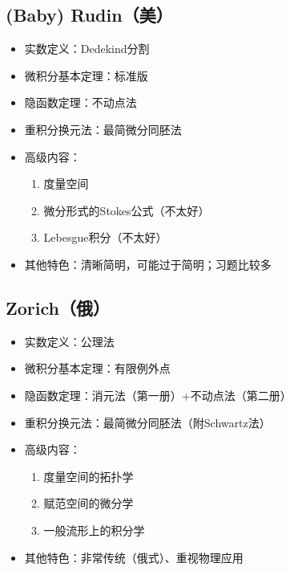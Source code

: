\documentclass[UTF8]{article}
\begin{document}
    \subsection{(Baby) Rudin（美）}
    \begin{itemize}
        \item 实数定义：Dedekind分割
        \item 微积分基本定理：标准版
        \item 隐函数定理：不动点法
        \item 重积分换元法：最简微分同胚法
        \item 高级内容：\begin{enumerate}
            \item 度量空间
            \item 微分形式的Stokes公式（不太好）
            \item Lebesgue积分（不太好）
        \end{enumerate}
        \item 其他特色：清晰简明，可能过于简明；习题比较多
    \end{itemize}
    \subsection{Zorich（俄）}
    \begin{itemize}
        \item 实数定义：公理法
        \item 微积分基本定理：有限例外点
        \item 隐函数定理：消元法（第一册）+不动点法（第二册）
        \item 重积分换元法：最简微分同胚法（附Schwartz法）
        \item 高级内容：\begin{enumerate}
            \item 度量空间的拓扑学
            \item 赋范空间的微分学
            \item 一般流形上的积分学
        \end{enumerate}
        \item 其他特色：非常传统（俄式）、重视物理应用
    \end{itemize}
\end{document}
